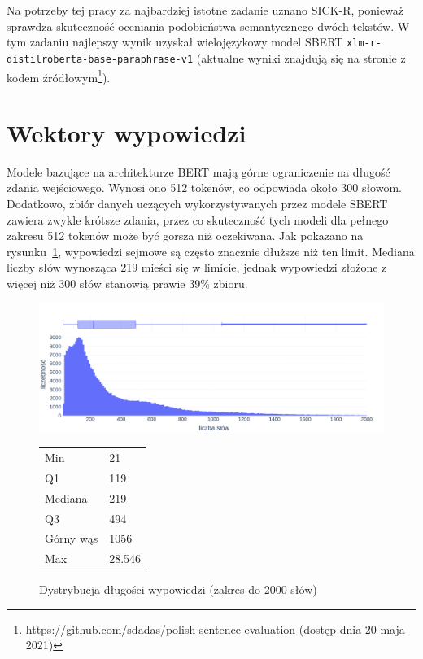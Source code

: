 	Na potrzeby tej pracy za najbardziej istotne zadanie uznano SICK-R, ponieważ sprawdza skuteczność oceniania podobieństwa semantycznego dwóch tekstów.
	W tym zadaniu najlepszy wynik uzyskał wielojęzykowy model SBERT \verb|xlm-r-distilroberta-base-paraphrase-v1|
		(aktualne wyniki znajdują się na stronie z kodem źródłowym\footnote{\url{https://github.com/sdadas/polish-sentence-evaluation} (dostęp dnia 20 maja 2021)}).

\section{Wektory wypowiedzi}\label{sec:sentences}
	Modele bazujące na architekturze BERT mają górne ograniczenie na długość zdania wejściowego.
	Wynosi ono 512 tokenów, co odpowiada około 300 słowom.
	Dodatkowo, zbiór danych uczących wykorzystywanych przez modele SBERT zawiera zwykle krótsze zdania,
		przez co skuteczność tych modeli dla pełnego zakresu 512 tokenów może być gorsza niż oczekiwana.
	Jak pokazano na rysunku~\ref{fig:word_count}, wypowiedzi sejmowe są często znacznie dłuższe niż ten limit.
	Mediana liczby słów wynosząca 219 mieści się w limicie, jednak wypowiedzi złożone z więcej niż 300 słów stanowią prawie 39\% zbioru.
  \begin{figure}[htb]
    \begin{minipage}{.75\textwidth}
      \includegraphics[width=\textwidth]{rys03/word_count.png}
    \end{minipage}%
    \begin{minipage}{.25\textwidth}
      \small
      \begin{tabularx}{\textwidth}{ll}
        Min & 21 \\ 
        Q1 & 119 \\ 
        Mediana & 219 \\
        Q3 & 494 \\ 
        Górny wąs & 1056 \\
        Max & 28.546 \\
      \end{tabularx}
    \end{minipage}
    \caption{Dystrybucja długości wypowiedzi (zakres do 2000 słów)}\label{fig:word_count}
  \end{figure}

